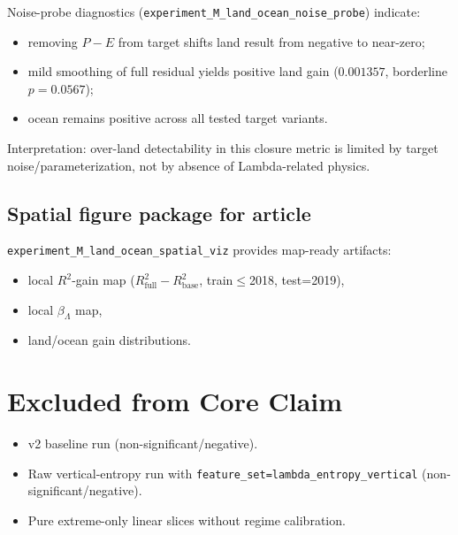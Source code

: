 \documentclass[11pt]{article}
\begin{document}
Noise-probe diagnostics (\texttt{experiment\_M\_land\_ocean\_noise\_probe}) indicate:
\begin{itemize}
  \item removing \(P-E\) from target shifts land result from negative to near-zero;
  \item mild smoothing of full residual yields positive land gain (\(0.001357\), borderline \(p=0.0567\));
  \item ocean remains positive across all tested target variants.
\end{itemize}
Interpretation: over-land detectability in this closure metric is limited by target noise/parameterization, not by absence of Lambda-related physics.

\subsection{Spatial figure package for article}
\texttt{experiment\_M\_land\_ocean\_spatial\_viz} provides map-ready artifacts:
\begin{itemize}
  \item local \(R^2\)-gain map (\(R^2_{\mathrm{full}}-R^2_{\mathrm{base}}\), train\(\le\)2018, test=2019),
  \item local \(\beta_\Lambda\) map,
  \item land/ocean gain distributions.
\end{itemize}

\section{Excluded from Core Claim}
\begin{itemize}
  \item v2 baseline run (non-significant/negative).
  \item Raw vertical-entropy run with \texttt{feature\_set=lambda\_entropy\_vertical} (non-significant/negative).
  \item Pure extreme-only linear slices without regime calibration.
\end{itemize}
\end{document}
